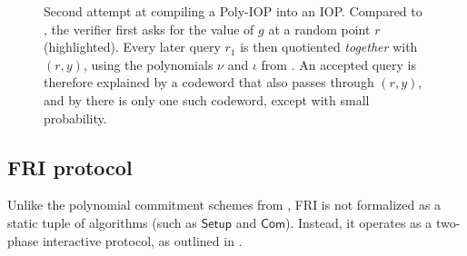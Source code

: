 \documentclass[../../book]{subfiles}
\begin{document}
\begin{figure}[h!]
{%
    }

    \caption{Second attempt at compiling a Poly-IOP into an IOP. Compared to , the verifier first asks for the value of $g$ at a random point $r$ (highlighted). Every later query $r_1$ is then quotiented \emph{together} with $(r, y)$, using the polynomials $\nu$ and $\iota$ from . An accepted query is therefore explained by a codeword that also passes through $(r, y)$, and by  there is only one such codeword, except with small probability.}
    \label{fig:poly-iop-second-attempt}
\end{figure}

\subsection{FRI protocol}\label{subsec:fri}
Unlike the polynomial commitment schemes from , FRI is not formalized as a static tuple of algorithms (such as $\mathsf{Setup}$ and $\mathsf{Com}$). Instead, it operates as a two-phase interactive protocol, as outlined in .
\end{document}
